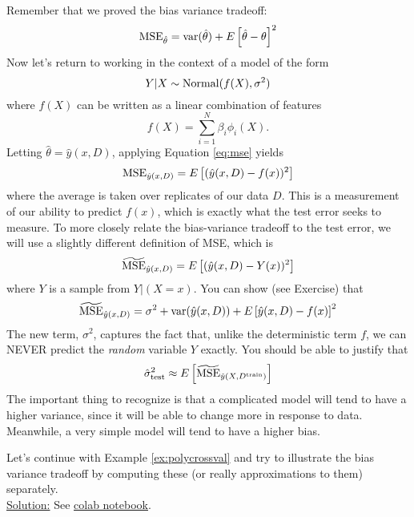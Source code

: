 Remember that we proved the bias variance tradeoff: 
\begin{equation}\label{eq:biasvar}
{\rm MSE}_{\hat{\theta}} = {\rm var}(\hat{\theta}) + E\left[\hat{\theta}-\theta\right]^2
\end{equation}
 Now let's return to working in the context of a model of the form 
\begin{equation*}
Y|X \sim {\rm Normal}(f(X),\sigma^2)
\end{equation*}
where $f(X)$ can be written as a linear combination of features
\begin{equation*}
f(X) = \sum_{i=1}^N\beta_i \phi_i(X). 
\end{equation*}
Letting $\hat{\theta} = \hat{y}(x,D)$, applying Equation \ref{eq:mse} yields
\begin{equation*}
{\rm MSE}_{\hat{y}(x,D)} = E\left[(\hat{y}(x,D)- f(x))^2\right]
\end{equation*}
where the average is taken over replicates of our data $D$. This is a measurement of our ability to predict $f(x)$, which is exactly what the test error seeks to measure. 
  To more closely relate the bias-variance tradeoff to the test error, we will use a slightly different definition of MSE, which is 
\begin{equation}\label{eq:tilMSE}
\widetilde{{\rm MSE}}_{\hat{y}(x,D)} = E\left[(\hat{y}(x,D)- Y(x))^2\right]
\end{equation}
where $Y$ is a sample from $Y|(X=x)$. You can show (see Exercise) that
\begin{equation*}
\widetilde{{\rm MSE}}_{\hat{y}(x,D)} = \sigma^2 +{\rm var}(\hat{y}(x,D)) + E\left[\hat{y}(x,D)-f(x)\right]^2
\end{equation*}
The new term, $\sigma^2$, captures the fact that, unlike the deterministic term $f$, we can NEVER predict the \emph{random} variable $Y$ exactly. 
You should be able to justify that
\begin{equation*}
\hat{\sigma}_{\rm test}^2 \approx E\left[\widetilde{{\rm MSE}}_{\hat{y}(X,D^{\rm train})}\right]
\end{equation*}
 The important thing to recognize is that a complicated model will tend to have a higher variance, since it will be able to change more in response to data. Meanwhile, a very simple model will tend to have a higher bias. 



\begin{example}

Let's continue with Example \ref{ex:polycrossval} and try to illustrate the bias variance tradeoff by computing these (or really approximations to them) separately. \\


\noindent
\underline{Solution:}  See \href{https://colab.research.google.com/drive/1EYcMviowfsnsVe7vsUKlyzkNsddUiTau?usp=sharing}{colab notebook}.

\end{example}

